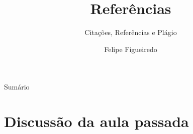 \documentclass{beamer}
\title%
{Referências}
\subtitle
{Citações, Referências e Plágio} %
\author%
{Felipe Figueiredo}%
\institute[INTO] %
{Instituto Nacional de Traumatologia e Ortopedia
}
\date%
{}
\begin{document}
\begin{frame}
  \titlepage
\end{frame}

\begin{frame}{Sumário}
  \tableofcontents
\end{frame}









\section{Discussão da aula passada}
\end{document}
